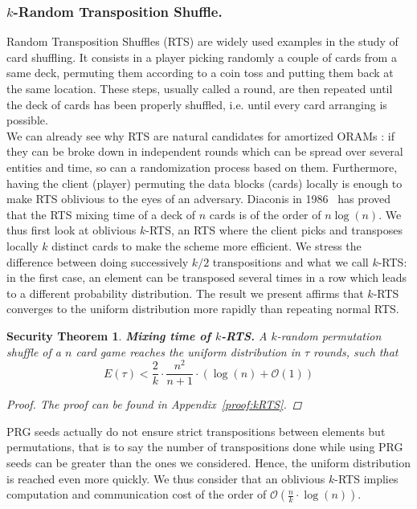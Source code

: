 \documentclass[USenglish,oneside,twocolumn]{article}
\newtheorem{secthm}{Security Theorem}
\begin{document}
%
\subsubsection{$k$-Random Transposition Shuffle.}\label{kRTS}
Random Transposition Shuffles (RTS) are widely used examples in the study of card shuffling. It consists in a player picking randomly a couple of cards from a same deck, permuting them according to a coin toss and putting them back at the same location.
These steps, usually called a round, are then repeated until the deck of cards has been properly shuffled, i.e. until every card arranging is possible.\\
We can already see why RTS are natural candidates for amortized ORAMs : if they can be broke down in independent rounds which can be spread over several entities and time, so can a randomization process based on them. Furthermore, having the client (player) permuting the data blocks (cards) locally is enough to make RTS oblivious to the eyes of an adversary.
Diaconis in 1986~\cite{aldous1986shuffling} has proved that the RTS mixing time of a deck of $n$ cards is of the order of $n\log(n)$. We thus first look at oblivious $k$-RTS, an RTS where the client picks and transposes locally $k$ distinct cards to make the scheme more efficient. We stress the difference between doing successively $k/2$ transpositions and what we call $k$-RTS: in the first case, an element can be transposed several times in a row which leads to a different probability distribution. The result we present affirms that  $k$-RTS converges to the uniform distribution more rapidly than repeating normal RTS.  

\begin{secthm}
\textbf{Mixing time of $k$-RTS.} A $k$-random permutation shuffle of a $n$ card game reaches the uniform distribution in $\tau$ rounds, such that
$$E(\tau) < \frac{2}{k}\cdot\frac{n^2}{n+1}\cdot \left ( \log(n) + \mathcal{O}(1) \right ) $$
\begin{proof}
The proof can be found in Appendix~\ref{proof:kRTS}.
\end{proof}
\end{secthm}

PRG seeds actually do not ensure strict transpositions between elements but permutations, that is to say the number of transpositions done while using PRG seeds can be greater than the ones we considered. Hence, the uniform distribution is reached even more quickly. We thus consider that an oblivious $k$-RTS implies computation and communication cost of the order of $\mathcal{O} \left(\frac{n}{k}\cdot \log(n)\right)$.\\
\end{document}
